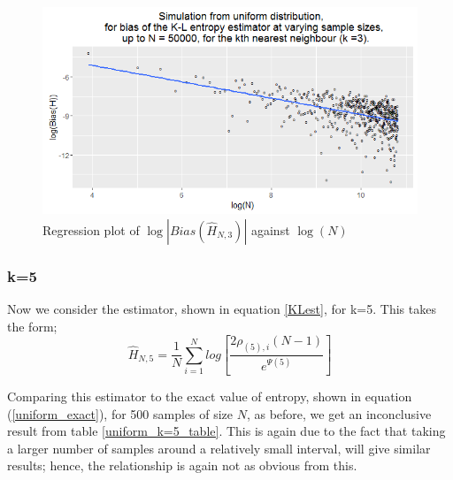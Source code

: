 \documentclass{article}
\begin{document}
\begin{figure}
  \begin{center}
    \includegraphics[width=\textwidth]{./Graphs/Uniform_k=3_plot.png}
  \end{center}
\caption{Regression plot of $\log|Bias(\hat{H}_{N, 3})|$ against $\log(N)$}
  \label{uniform_k=3_graph}
\end{figure}


\subsubsection{k=5} \label{U_k=5}
Now we consider the estimator, shown in equation \ref{KLest}, for k=5. This takes the form;
\begin{equation}
\hat{H}_{N, 5} = \frac{1}{N} \sum_{i=1}^{N} log \left[ \frac{2\rho_{(5),i}(N-1)}{e^{\Psi(5)}} \right] \nonumber
\end{equation}

Comparing this estimator to the exact value of entropy, shown in equation (\ref{uniform_exact}), for 500 samples of size $N$, as before, we get an inconclusive result from table \ref{uniform_k=5_table}. This is again due to the fact that taking a larger number of samples around a relatively small interval, will give similar results; hence, the relationship is again not as obvious from this. 
\end{document}
